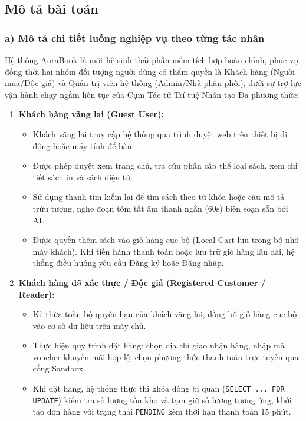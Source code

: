 \documentclass[11pt, a4paper]{report}
\begin{document}
\subsection{Mô tả bài toán}

\subsubsection{a) Mô tả chi tiết luồng nghiệp vụ theo từng tác nhân}

Hệ thống AuraBook là một hệ sinh thái phần mềm tích hợp hoàn chỉnh, phục vụ đồng thời hai nhóm đối tượng người dùng có thẩm quyền là Khách hàng (Người mua/Độc giả) và Quản trị viên hệ thống (Admin/Nhà phân phối), dưới sự trợ lực vận hành chạy ngầm liên tục của Cụm Tác tử Trí tuệ Nhân tạo Đa phương thức:

\begin{enumerate}
    \item \textbf{Khách hàng vãng lai (Guest User):}
    \begin{itemize}
        \item Khách vãng lai truy cập hệ thống qua trình duyệt web trên thiết bị di động hoặc máy tính để bàn.
        \item Được phép duyệt xem trang chủ, tra cứu phân cấp thể loại sách, xem chi tiết sách in và sách điện tử.
        \item Sử dụng thanh tìm kiếm lai để tìm sách theo từ khóa hoặc câu mô tả trừu tượng, nghe đoạn tóm tắt âm thanh ngắn ($60\text{s}$) biên soạn sẵn bởi AI.
        \item Được quyền thêm sách vào giỏ hàng cục bộ (Local Cart lưu trong bộ nhớ máy khách). Khi tiến hành thanh toán hoặc lưu trữ giỏ hàng lâu dài, hệ thống điều hướng yêu cầu Đăng ký hoặc Đăng nhập.
    \end{itemize}
    \item \textbf{Khách hàng đã xác thực / Độc giả (Registered Customer / Reader):}
    \begin{itemize}
        \item Kế thừa toàn bộ quyền hạn của khách vãng lai, đồng bộ giỏ hàng cục bộ vào cơ sở dữ liệu trên máy chủ.
        \item Thực hiện quy trình đặt hàng: chọn địa chỉ giao nhận hàng, nhập mã voucher khuyến mãi hợp lệ, chọn phương thức thanh toán trực tuyến qua cổng Sandbox.
        \item Khi đặt hàng, hệ thống thực thi khóa dòng bi quan (\texttt{SELECT ... FOR UPDATE}) kiểm tra số lượng tồn kho và tạm giữ số lượng tương ứng, khởi tạo đơn hàng với trạng thái \texttt{PENDING} kèm thời hạn thanh toán 15 phút.

\end{itemize}
\end{enumerate}
\end{document}
